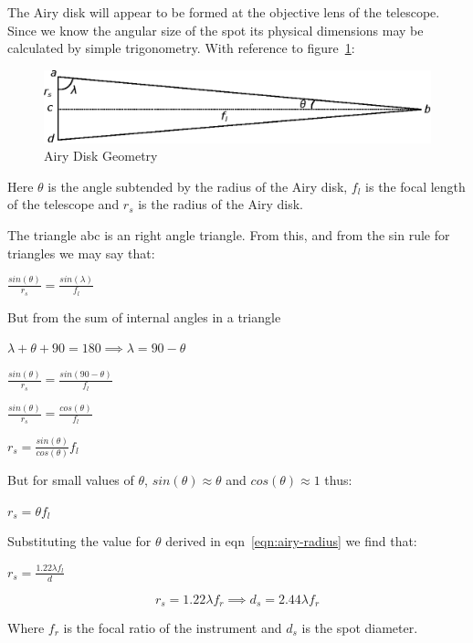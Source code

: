 \documentclass[11pt]{article}
\begin{document}
The Airy disk will appear to be formed at the objective lens of the telescope.  Since we know the angular size of the spot its physical dimensions may be calculated by simple trigonometry. With reference to figure~\ref{fig:spot_geometry}:


\begin{figure}[htb]
	\begin{center}
		\includegraphics[]{spot_size_figure.eps}
		\caption{Airy Disk Geometry}
		\label{fig:spot_geometry}
	\end{center}
\end{figure}


Here $\theta$ is the angle subtended by the radius of the Airy disk, $f_{l}$ is the focal length of the telescope and $r_{s}$ is the radius of the Airy disk.

The triangle abc is an right angle triangle.  From this, and from the sin rule for triangles we may say that:

\LARGE
$\frac{sin(\theta)}{r_{s}} = \frac{sin(\lambda)}{f_{l}}$
\large

But from the sum of internal angles in a triangle

$\lambda+\theta+90=180 \implies \lambda=90-\theta$

\LARGE
$\frac{sin(\theta)}{r_{s}} = \frac{sin(90-\theta)}{f_{l}}$

\LARGE
$\frac{sin(\theta)}{r_{s}} = \frac{cos(\theta)}{f_{l}}$

\LARGE
$r_{s}=\frac{sin(\theta)}{cos(\theta)} f_{l}$

\large
But for small values of $\theta$, $sin(\theta)\approx\theta$ and $cos(\theta)\approx 1$ thus:

\Large
$r_{s}=\theta f_{l}$

\large
Substituting the value for $\theta$ derived in eqn~\ref{eqn:airy-radius} we find that:

\LARGE
$r_{s}=\frac{1.22\lambda f_{l}}{d} $

\Large
\begin{equation}
\label{eqn:spot-diameter}
r_{s}=1.22\lambda f_{r} \implies d_{s}=2.44\lambda f_{r}
\end{equation}

\large
Where $f_{r}$ is the focal ratio of the instrument and $d_{s}$ is the spot diameter.
\end{document}
